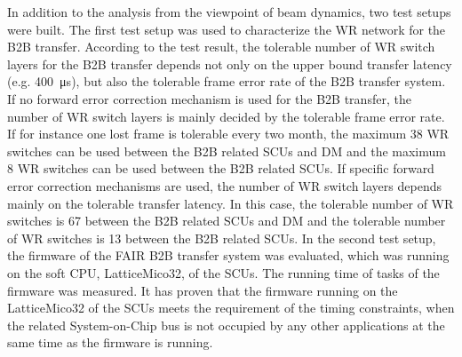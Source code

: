 In addition to the analysis from the viewpoint of beam dynamics, two test setups were built. The first test setup was used to characterize the WR network for the B2B transfer. According to the test result, the tolerable number of WR switch layers for the B2B transfer depends not only on the upper bound transfer latency (e.g. \SI{400}{\us}), but also the tolerable frame error rate of the B2B transfer system. If no forward error correction mechanism is used for the B2B transfer, the number of WR switch layers is mainly decided by the tolerable frame error rate. If for instance one lost frame is tolerable every two month, the maximum 38 WR switches can be used between the B2B related SCUs and DM and the maximum 8 WR switches can be used between the B2B related SCUs. If specific forward error correction mechanisms are used, the number of WR switch layers depends mainly on the tolerable transfer latency. In this case, the tolerable number of WR switches is 67 between the B2B related SCUs and DM and the tolerable number of WR switches is 13 between the B2B related SCUs. In the second test setup, the firmware of the FAIR B2B transfer system was evaluated, which was running on the soft CPU, LatticeMico32, of the SCUs. The running time of tasks of the firmware was measured. It has proven that the firmware running on the LatticeMico32 of the SCUs meets the requirement of the timing constraints, when the related System-on-Chip bus is not occupied by any other applications at the same time as the firmware is running.


